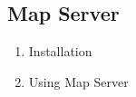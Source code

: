 \documentclass{article}
\begin{document}
\subsection{Map Server}
\begin{enumerate}

\item Installation
\begin{enumerate}
\end{enumerate}

\item Using Map Server
\begin{enumerate}
\end{enumerate}
\end{enumerate}
\end{document}
